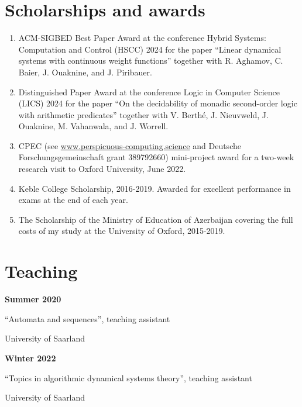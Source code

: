 \documentclass{article}
\begin{document}
	\section*{Scholarships and awards}
	\begin{enumerate}
		\item ACM-SIGBED Best Paper Award at the conference Hybrid Systems: Computation and Control (HSCC) 2024 for the paper ``Linear dynamical systems with continuous weight functions'' together with R. Aghamov, C. Baier, J. Ouaknine, and J. Piribauer. 
		\item Distinguished Paper Award at the conference Logic in Computer Science (LICS) 2024 for the paper ``On the decidability of monadic second-order logic with arithmetic predicates'' together with V. Berth\'e, J. Nieuvweld, J. Ouaknine, M. Vahanwala, and J. Worrell. 
		\item CPEC (see \url{www.perspicuous-computing.science} and Deutsche Forschungsgemeinschaft grant 389792660) mini-project award for a two-week research visit to Oxford University, June 2022.
		\item Keble College Scholarship, 2016-2019. Awarded for excellent performance in exams at the end of each year.
		\item The Scholarship of the Ministry of Education of Azerbaijan covering the full costs of my study at the University of Oxford, 2015-2019.
	\end{enumerate}
	
	\section*{Teaching}
	\noindent\begin{minipage}{0.3\textwidth}
		\hspace{0.5cm} \textbf{Summer 2020}
	\end{minipage}
	\begin{minipage}{0.7\textwidth}
		``Automata and sequences'', teaching assistant 
		
		University of Saarland
	\end{minipage}
	
	\vspace{0.3cm}
	
	\noindent\begin{minipage}{0.3\textwidth}
		\hspace{0.5cm} \textbf{Winter 2022}
	\end{minipage}
	\begin{minipage}{0.7\textwidth}
		``Topics in algorithmic dynamical systems theory'', teaching assistant 
		
		University of Saarland
	\end{minipage}
\end{document}

